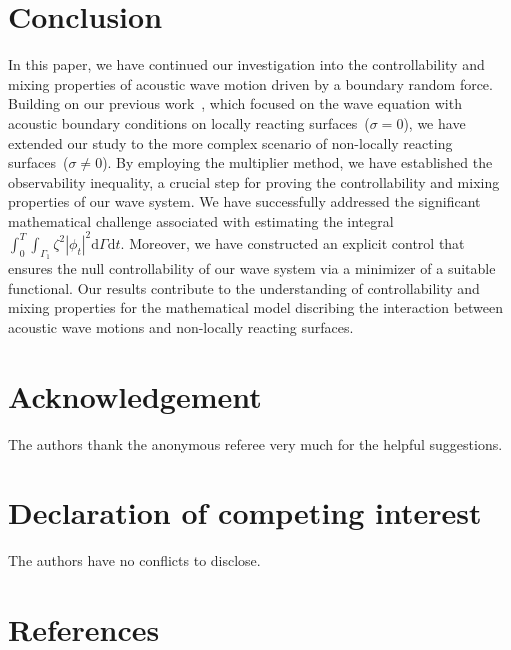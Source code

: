 \documentclass[10pt]{elsarticle}
\begin{document}
\section{Conclusion}
\label{sec:conclusion}

In this paper, we have continued our investigation into the controllability and mixing properties of acoustic wave motion driven by a boundary random force. Building on our previous work~\cite{jiao2025mixing}, which focused on the wave equation with acoustic boundary conditions on locally reacting surfaces~($\sigma = 0$), we have extended our study to the more complex scenario of non-locally reacting surfaces~($\sigma \neq 0$). By employing the multiplier method, we have established the observability inequality, a crucial step for proving the controllability and mixing properties of our wave system. We have successfully addressed the significant mathematical challenge associated with estimating the integral~$\int_{0}^{T}\int_{\Gamma_1}\zeta^2|\phi_t|^2 \mathrm{d}\Gamma \mathrm{d}t$. Moreover, we have constructed an explicit control that ensures the null controllability of our wave system via a minimizer of a suitable functional.
Our results contribute to the understanding of controllability and mixing properties for the mathematical model discribing the interaction between acoustic wave motions and non-locally reacting surfaces.

\section*{Acknowledgement}
The authors thank the anonymous referee very much for the helpful suggestions.

\section*{Declaration of competing interest}
The authors have no conflicts to disclose.


\section*{References}


\end{document}
